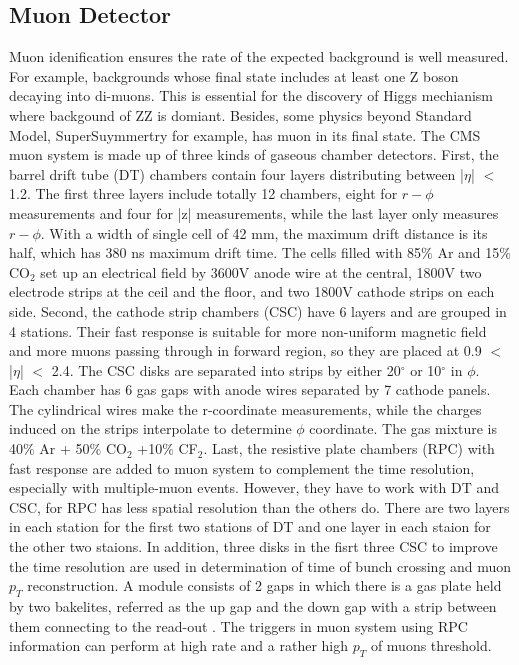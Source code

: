 \subsection{Muon Detector} 
Muon idenification ensures the rate of the expected background is well measured. 
For example, backgrounds whose final state includes at least one Z boson decaying into di-muons. 
This is essential for the discovery of Higgs mechianism where backgound of ZZ is domiant.
Besides, some physics beyond Standard Model, SuperSuymmertry for example, has muon in its final state.
The CMS muon system is made up of three kinds of gaseous chamber detectors. 
First, the barrel drift tube (DT) chambers contain four layers distributing between |$\eta $| $<$1.2.
The first three layers include totally 12 chambers, eight for $r-\phi$ measurements and four for |z| measurements, while the last layer only measures $r-\phi$. 
With a width of single cell of 42 mm, the maximum drift distance is its half, which has 380 ns maximum drift time. 
The cells filled with 85$\% $ Ar and 15$\% $ CO$_2$ set up an electrical field by 3600V anode wire at the central, 1800V two electrode strips at the ceil and the floor, and two  1800V cathode strips on each side. 
Second, the cathode strip chambers (CSC) have 6 layers and are grouped in 4 stations.
Their fast response is suitable for more non-uniform magnetic field and more muons passing through in forward region, so they are placed at 0.9 $<$ |$\eta $| $<$ 2.4.
The CSC disks are separated into strips by either 20$^{\circ} $ or 10$^{\circ} $ in $\phi $. 
Each chamber has 6 gas gaps with anode wires separated by 7 cathode panels. 
The cylindrical wires make the r-coordinate measurements, while the charges induced on the strips interpolate to determine $\phi $ coordinate.
The gas mixture is 40$\% $ Ar + 50$\% $ CO$_2$ +10$\% $ CF$_2$. 
Last, the resistive plate chambers (RPC) with fast response are added to muon system to complement the time resolution, especially with multiple-muon events.
However, they have to work with DT and CSC, for RPC has less spatial resolution than the others do.
There are two layers in each station for the first two stations of DT and one layer in each staion for the other two staions. 
In addition, three disks in the fisrt three CSC to improve the time resolution are used in determination of time of bunch crossing and muon $p_T$ reconstruction.
A module consists of 2 gaps in which there is a gas plate held by two bakelites, referred as the up gap and the down gap with a strip between them connecting to the read-out .
The triggers in muon system using RPC information can perform at high rate and a rather high $p_{T}$ of muons threshold.

